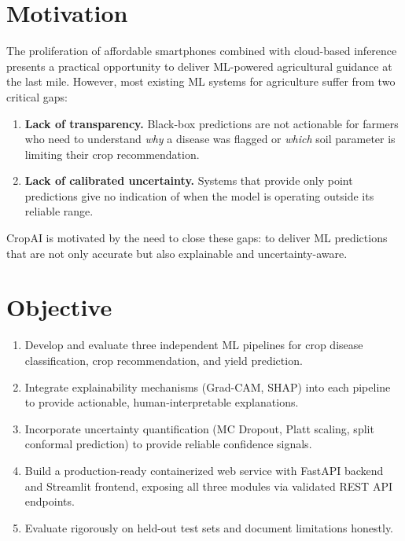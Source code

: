 \documentclass[12pt,a4paper]{report}
\begin{document}
\section{Motivation}
The proliferation of affordable smartphones combined with cloud-based inference presents a practical opportunity to deliver ML-powered agricultural guidance at the last mile. However, most existing ML systems for agriculture suffer from two critical gaps:
\begin{enumerate}[leftmargin=*]
  \item \textbf{Lack of transparency.} Black-box predictions are not actionable for farmers who need to understand \emph{why} a disease was flagged or \emph{which} soil parameter is limiting their crop recommendation.
  \item \textbf{Lack of calibrated uncertainty.} Systems that provide only point predictions give no indication of when the model is operating outside its reliable range.
\end{enumerate}
CropAI is motivated by the need to close these gaps: to deliver ML predictions that are not only accurate but also explainable and uncertainty-aware.

\section{Objective}
\begin{enumerate}[leftmargin=*]
  \item Develop and evaluate three independent ML pipelines for crop disease classification, crop recommendation, and yield prediction.
  \item Integrate explainability mechanisms (Grad-CAM, SHAP) into each pipeline to provide actionable, human-interpretable explanations.
  \item Incorporate uncertainty quantification (MC Dropout, Platt scaling, split conformal prediction) to provide reliable confidence signals.
  \item Build a production-ready containerized web service with FastAPI backend and Streamlit frontend, exposing all three modules via validated REST API endpoints.
  \item Evaluate rigorously on held-out test sets and document limitations honestly.
\end{enumerate}
\end{document}
